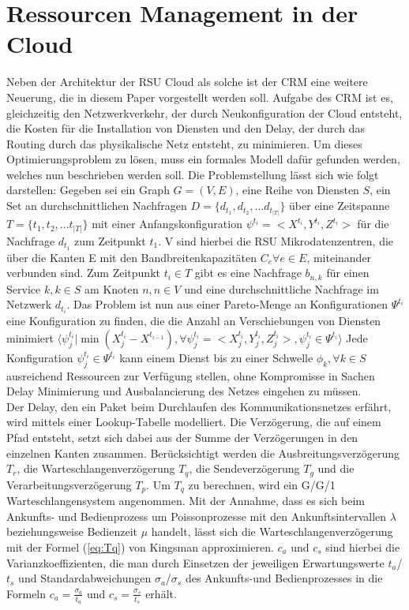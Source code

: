 \documentclass[conference]{IEEEtran}
\begin{document}
\section{Ressourcen Management in der Cloud}

Neben der Architektur der RSU Cloud als solche ist der CRM eine weitere
Neuerung, die in diesem Paper vorgestellt werden soll.  Aufgabe des CRM ist es, gleichzeitig den Netzwerkverkehr, der durch Neukonfiguration der Cloud entsteht, die Kosten für die Installation von Diensten und den Delay, der durch das Routing durch das physikalische Netz entsteht, zu minimieren.
Um dieses Optimierungsproblem zu lösen, muss ein formales Modell dafür gefunden werden, welches nun beschrieben werden soll. Die Problemstellung lässt sich wie folgt darstellen: Gegeben sei ein Graph \(G=(V,E)\), eine Reihe von Diensten \(S\), ein Set an durchschnittlichen Nachfragen \(D=\{d_{t_1},d_{t_2},…d_{t_{|T|}}\}\) über eine Zeitspanne \(T=\{t_1,t_2,… t_{|T|}\}\) mit einer Anfangskonfiguration \(\psi^{t_i}=<X^{t_i},Y^{t_i},Z^{t_i}>\) für die Nachfrage \(d_{t_1}\)
zum Zeitpunkt \(t_1\). V sind hierbei die RSU Mikrodatenzentren, die über die Kanten E mit
den Bandbreitenkapazitäten \(C_e \forall e \in E\), miteinander verbunden sind. Zum
Zeitpunkt \(t_i \in T\) gibt es eine Nachfrage \(b_{n,k}\) für einen Service \(k, k \in S\) am Knoten \(n, n\in V\) und eine durchschnittliche Nachfrage im Netzwerk \(d_{t_i}\). Das Problem ist nun aus einer Pareto-Menge an Konfigurationen \(\Psi^{t_i}\) eine Konfiguration zu finden, die die Anzahl an Verschiebungen von Diensten minimiert \(\langle \psi_{j}^{t_i}|\min(X_{j}^{t_i}-X^{t_{i-1}}),\forall \psi_{j}^{t_i}=<X_{j}^{t_i},Y_{j}^{t_i},Z_{j}^{t_i}>, \psi_{j}^{t_i} \in \Psi^{t_i}  \rangle\) Jede Konfiguration \(\psi_{j}^{t_i} \in \Psi^{t_i}\) kann einem Dienst bis zu einer Schwelle \(\phi_k, \forall k \in S\) ausreichend Ressourcen zur Verfügung stellen, ohne Kompromisse in Sachen Delay Minimierung und Ausbalancierung des Netzes eingehen zu müssen.\\
Der Delay, den ein Paket beim Durchlaufen des Kommunikationsnetzes erfährt, wird mittels einer Lookup-Tabelle modelliert. Die Verzögerung, die auf einem Pfad entsteht, setzt sich dabei aus der Summe der Verzögerungen in den einzelnen Kanten zusammen. Berücksichtigt werden die Ausbreitungsverzögerung \(T_r\), die Warteschlangenverzögerung \(T_q\), die Sendeverzögerung \(T_g\) und die Verarbeitungsverzögerung \(T_p\). Um \(T_q\) zu berechnen, wird ein G/G/1 Warteschlangensystem angenommen. Mit der Annahme, dass es sich beim Ankunfts- und Bedienprozess um Poissonprozesse mit den Ankunftsintervallen \(\lambda\) beziehungsweise Bedienzeit \(\mu\) handelt, lässt sich die Warteschlangenverzögerung mit der Formel (\ref{eq:Tq}) von Kingsman \cite{IEEEhowto:king} approximieren. \(c_a\) und \(c_s\) sind hierbei die Varianzkoeffizienten, die man durch Einsetzen der jeweiligen Erwartungswerte \(t_a\)/\(t_s\) und Standardabweichungen \(\sigma_a\)/\(\sigma_s\) des Ankunfts-und Bedienprozesses in die Formeln \(c_a=\frac{\sigma_a}{t_a}\) und \(c_s=\frac{\sigma_s}{t_s}\) erhält.
\end{document}
